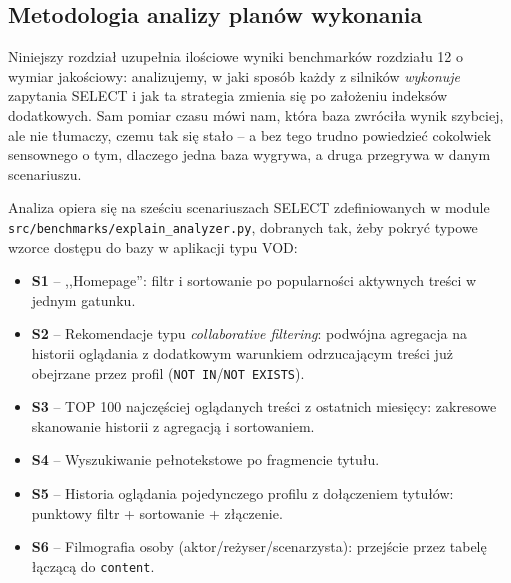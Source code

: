\subsection{Metodologia analizy planów wykonania}

Niniejszy rozdział uzupełnia ilościowe wyniki benchmarków rozdziału 12
o wymiar jakościowy: analizujemy, w jaki sposób każdy z silników
\emph{wykonuje} zapytania SELECT i jak ta strategia zmienia się po
założeniu indeksów dodatkowych. Sam pomiar czasu mówi nam, która baza
zwróciła wynik szybciej, ale nie tłumaczy, czemu tak się stało --
a bez tego trudno powiedzieć cokolwiek sensownego o tym, dlaczego
jedna baza wygrywa, a druga przegrywa w danym scenariuszu.

Analiza opiera się na sześciu scenariuszach SELECT zdefiniowanych
w module \\\texttt{src/benchmarks/explain\_analyzer.py}, dobranych tak,
żeby pokryć typowe wzorce dostępu do bazy w aplikacji typu VOD:

\begin{itemize}
    \item \textbf{S1} -- ,,Homepage'': filtr i sortowanie po popularności
    aktywnych treści w jednym gatunku.
    \item \textbf{S2} -- Rekomendacje typu \emph{collaborative filtering}:
    podwójna agregacja na historii oglądania z dodatkowym warunkiem
    odrzucającym treści już obejrzane przez profil
    (\texttt{NOT IN}/\texttt{NOT EXISTS}).
    \item \textbf{S3} -- TOP 100 najczęściej oglądanych treści z ostatnich
    miesięcy: zakresowe skanowanie historii z agregacją i sortowaniem.
    \item \textbf{S4} -- Wyszukiwanie pełnotekstowe po fragmencie tytułu.
    \item \textbf{S5} -- Historia oglądania pojedynczego profilu z
    dołączeniem tytułów: punktowy filtr + sortowanie + złączenie.
    \item \textbf{S6} -- Filmografia osoby (aktor/reżyser/scenarzysta):
    przejście przez tabelę łączącą do \texttt{content}.
\end{itemize}

